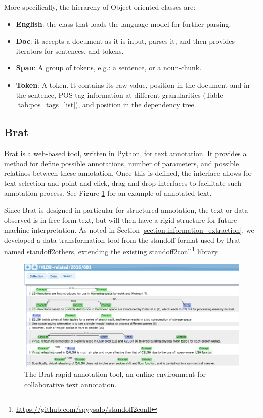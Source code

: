 \documentclass[11pt,a4paper,openright]{memoir}
\begin{document}
More specifically, the hierarchy of Object-oriented classes are:
\begin{itemize}
	\item \textbf{English}: the class that loads the language model for further parsing.
	\item \textbf{Doc}: it accepts a document as it is input, parses it, and then provides iterators for sentences, and tokens.
	\item \textbf{Span}: A group of tokens, e.g.: a sentence, or a noun-chunk.
	\item \textbf{Token}: A token. It contains its raw value, position in the document and in the sentence, POS tag information at different granularities (Table \ref{tab:pos_tags_list}), and position in the dependency tree.
\end{itemize}


\subsection{Brat}

Brat \cite{Stenetorp:2012:BWT:2380921.2380942} is a web-based tool, written in Python, for text annotation. It provides a method for define possible annotations, number of parameters, and possible relatinos between these annotation. Once this is defined, the interface allows for text selection and point-and-click, drag-and-drop interfaces to facilitate such annotation process. See Figure \ref{fig:brat_img} for an example of annotated text.

Since Brat is designed in particular for structured annotation, the text or data observed is in free form text, but will then have a rigid structure for future machine interpretation. As noted in Section \ref{section:information_extraction}, we developed a data transformation tool from the standoff format used by Brat named standoff2others, extending the existing standoff2conll\footnote{\url{https://github.com/spyysalo/standoff2conll}} library.

\begin{figure}[!htbp]
  \centering
    \includegraphics[width=1.0\textwidth]{./images/brat_img}
  \caption[The Brat rapid annotation tool, an online environment for collaborative text annotation.]{The Brat rapid annotation tool, an online environment for collaborative text annotation.}
  \label{fig:brat_img}
\end{figure}
\end{document}
